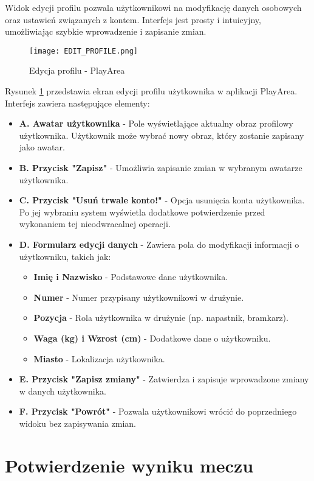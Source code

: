 \documentclass[wmii,inf,inz]{uwmthesis} %
\begin{document}
Widok edycji profilu pozwala użytkownikowi na modyfikację danych osobowych oraz ustawień związanych z kontem. Interfejs jest prosty i intuicyjny, umożliwiając szybkie wprowadzenie i zapisanie zmian.

\begin{figure}[H]
    \centering
    \texttt{[image: EDIT\_PROFILE.png]}
    \caption{Edycja profilu - PlayArea}
    \label{fig:edit_profile}
\end{figure}

\noindent
Rysunek \ref{fig:edit_profile} przedstawia ekran edycji profilu użytkownika w aplikacji PlayArea. Interfejs zawiera następujące elementy:
\begin{itemize}
    \item \textbf{A. Awatar użytkownika} - Pole wyświetlające aktualny obraz profilowy użytkownika. Użytkownik może wybrać nowy obraz, który zostanie zapisany jako awatar.
    \item \textbf{B. Przycisk "Zapisz"} - Umożliwia zapisanie zmian w wybranym awatarze użytkownika.
    \item \textbf{C. Przycisk "Usuń trwale konto!"} - Opcja usunięcia konta użytkownika. Po jej wybraniu system wyświetla dodatkowe potwierdzenie przed wykonaniem tej nieodwracalnej operacji.
    \item \textbf{D. Formularz edycji danych} - Zawiera pola do modyfikacji informacji o użytkowniku, takich jak:
    \begin{itemize}[label=$\cdot$]
        \item \textbf{Imię i Nazwisko} - Podstawowe dane użytkownika.
        \item \textbf{Numer} - Numer przypisany użytkownikowi w drużynie.
        \item \textbf{Pozycja} - Rola użytkownika w drużynie (np. napastnik, bramkarz).
        \item \textbf{Waga (kg) i Wzrost (cm)} - Dodatkowe dane o użytkowniku.
        \item \textbf{Miasto} - Lokalizacja użytkownika.
    \end{itemize}
    \item \textbf{E. Przycisk "Zapisz zmiany"} - Zatwierdza i zapisuje wprowadzone zmiany w danych użytkownika.
    \item \textbf{F. Przycisk "Powrót"} - Pozwala użytkownikowi wrócić do poprzedniego widoku bez zapisywania zmian.
\end{itemize}
\section{Potwierdzenie wyniku meczu}
\end{document}

